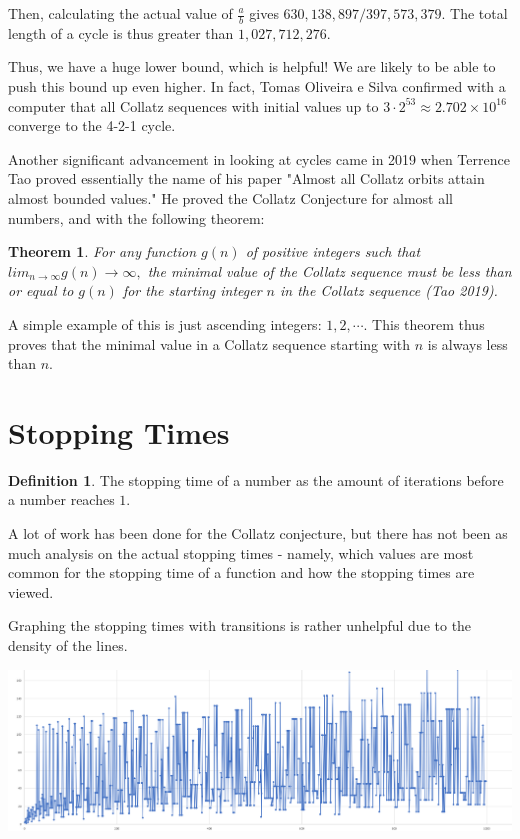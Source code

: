 \documentclass{article}
\newtheorem{theorem}{Theorem}
\theoremstyle{remark}
\theoremstyle{problem}
\numberwithin{problem}{subsection}
\numberwithin{Problem}{section}
\theoremstyle{definition}
\newtheorem*{definition}{Definition}
\theoremstyle{definition}
\theoremstyle{definition}
\begin{document}
Then, calculating the actual value of $\frac{a}{b}$ gives $630,138,897/397,573,379.$ The total length of a cycle is thus greater than $1,027,712,276.$

Thus, we have a huge lower bound, which is helpful! We are likely to be able to push this bound up even higher. In fact, Tomas Oliveira e Silva confirmed with a computer that all Collatz sequences with initial values up to $3 \cdot 2^{53} \approx 2.702 \times 10^{16}$ converge to the 4-2-1 cycle.

Another significant advancement in looking at cycles came in 2019 when Terrence Tao proved essentially the name of his paper "Almost all Collatz orbits attain almost bounded values." He  proved the Collatz Conjecture for almost all numbers, and with the following theorem: 

\begin{theorem}
    For any function $g(n)$ of positive integers such that $lim_{n \to \infty} g(n) \to \infty,$ the minimal value of the Collatz sequence must be less than or equal to $g(n)$ for the starting integer $n$ in the Collatz sequence (Tao 2019).
\end{theorem}

A simple example of this is just ascending integers: $1, 2, \cdots$. This theorem thus proves that the minimal value in a Collatz sequence starting with $n$ is always less than $n.$ 



\section{Stopping Times}

\begin{definition}
    The stopping time of a number as the amount of iterations before a number reaches $1.$ 
\end{definition}

A lot of work has been done for the Collatz conjecture, but there has not been as much analysis on the actual stopping times - namely, which values are most common for the stopping time of a function and how the stopping times are viewed. 

Graphing the stopping times with transitions is rather unhelpful due to the density of the lines. 

\begin{centering}
\includegraphics[width = \textwidth]{images/1000 Collatz Stopping Times with Lines.png}
\end{centering}
\end{document}
